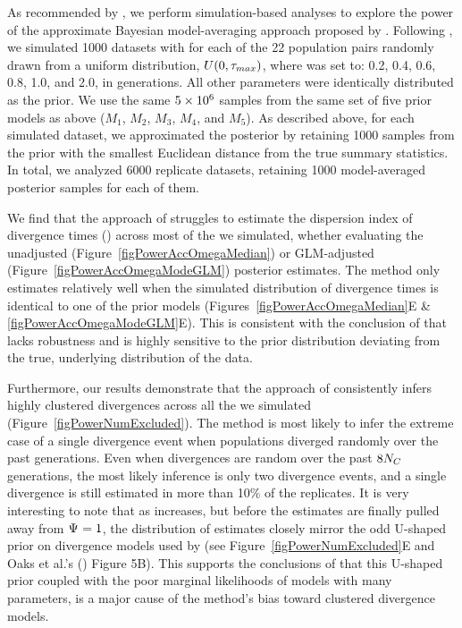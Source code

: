 As recommended by \citet{Oaks2012}, we perform simulation-based analyses
to explore the power of the approximate Bayesian model-averaging approach
proposed by \citet{Hickerson2013}.
Following \citet{Oaks2012}, we simulated 1000 datasets with \divt{} for each of
the 22 population pairs randomly drawn from a uniform distribution, $U(0,
\tau_{max})$, where  was set to: 0.2, 0.4, 0.6, 0.8, 1.0, and 2.0, in
\globalcoalunit generations.
All other parameters were identically distributed as the prior.
We use the same $5\times 10^{6}$ samples from the same set of five prior models as above
($M_1$, $M_2$, $M_3$, $M_4$, and $M_5$).
As described above, for each simulated dataset, we approximated the posterior
by retaining 1000 samples from the prior with the smallest Euclidean distance
from the true summary statistics.
In total, we analyzed 6000 replicate datasets, retaining 1000 model-averaged
posterior samples for each of them.

We find that the approach of \citet{Hickerson2013} struggles to estimate the
dispersion index of divergence times (\vmratio{}) across most of the 
we simulated, whether evaluating the unadjusted
(Figure~\ref{figPowerAccOmegaMedian}) or GLM-adjusted
(Figure~\ref{figPowerAccOmegaModeGLM}) posterior estimates.
The method only estimates \vmratio{} relatively well when the simulated
distribution of divergence times is identical to one of the prior models
(Figures~\ref{figPowerAccOmegaMedian}E \& \ref{figPowerAccOmegaModeGLM}E).
This is consistent with the conclusion of \citet{Oaks2012} that \msb lacks
robustness and is highly sensitive to the prior distribution deviating from the
true, underlying distribution of the data.

Furthermore, our results demonstrate that the approach of \citet{Hickerson2013}
consistently infers highly clustered divergences across all the  we
simulated (Figure~\ref{figPowerNumExcluded}).
The method is most likely to infer the extreme case of a single divergence event
when populations diverged randomly over the past \globalcoalunit generations.
Even when divergences are random over the past $8N_C$ generations,
the most likely inference is only two divergence events, and a single 
divergence is still estimated in more than 10\% of the replicates.
It is very interesting to note that as  increases, but before the
estimates are finally pulled away from $\Psi_{} = 1$, the distribution of
\numt{} estimates closely mirror the odd U-shaped prior on divergence models
used by \msb (see Figure~\ref{figPowerNumExcluded}E and Oaks et al.'s
(\citeyear{Oaks2012}) Figure 5B).
This supports the conclusions of \citet{Oaks2012} that this U-shaped
prior coupled with the poor marginal likelihoods of models with many
\divt{} parameters, is a major cause of the method's bias toward
clustered divergence models.

